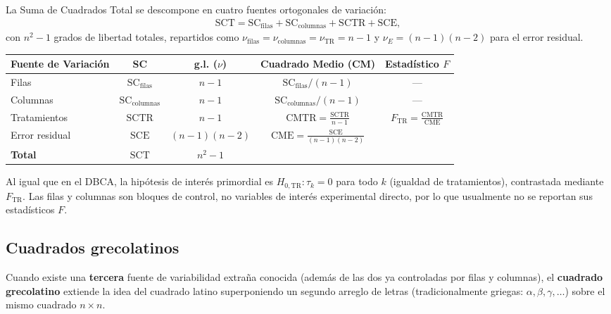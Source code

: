 \begin{teorema}
	La Suma de Cuadrados Total se descompone en cuatro fuentes ortogonales de variación:
	\begin{align}
		\text{SCT} = \text{SC}_{\text{filas}} + \text{SC}_{\text{columnas}} + \text{SCTR} + \text{SCE},
	\end{align}
	con $n^2 - 1$ grados de libertad totales, repartidos como $\nu_{\text{filas}} = \nu_{\text{columnas}} = \nu_{\text{TR}} = n-1$ y $\nu_E = (n-1)(n-2)$ para el error residual.
\end{teorema}

\begin{center}
	\begin{tabular}{lcccc}
		\hline
		\textbf{Fuente de Variación} & \textbf{SC} & \textbf{g.l. ($\nu$)} & \textbf{Cuadrado Medio (CM)} & \textbf{Estadístico $F$} \\ \hline
		Filas & $\text{SC}_{\text{filas}}$ & $n-1$ & $\text{SC}_{\text{filas}}/(n-1)$ & --- \\ [1ex]
		Columnas & $\text{SC}_{\text{columnas}}$ & $n-1$ & $\text{SC}_{\text{columnas}}/(n-1)$ & --- \\ [1ex]
		Tratamientos & $\text{SCTR}$ & $n-1$ & $\text{CMTR} = \frac{\text{SCTR}}{n-1}$ & $F_{\text{TR}} = \frac{\text{CMTR}}{\text{CME}}$ \\ [1ex]
		Error residual & $\text{SCE}$ & $(n-1)(n-2)$ & $\text{CME} = \frac{\text{SCE}}{(n-1)(n-2)}$ & \\ [1ex] \hline
		\textbf{Total} & $\text{SCT}$ & $n^2 - 1$ & & \\ \hline
	\end{tabular}
\end{center}

\begin{observacion}
	Al igual que en el DBCA, la hipótesis de interés primordial es $H_{0,\text{TR}}: \tau_k = 0$ para todo $k$ (igualdad de tratamientos), contrastada mediante $F_{\text{TR}}$. Las filas y columnas son bloques de control, no variables de interés experimental directo, por lo que usualmente no se reportan sus estadísticos $F$.
\end{observacion}

\subsection{Cuadrados grecolatinos}

Cuando existe una \textbf{tercera} fuente de variabilidad extraña conocida (además de las dos ya controladas por filas y columnas), el \textbf{cuadrado grecolatino} extiende la idea del cuadrado latino superponiendo un segundo arreglo de letras (tradicionalmente griegas: $\alpha, \beta, \gamma, \ldots$) sobre el mismo cuadrado $n \times n$.

